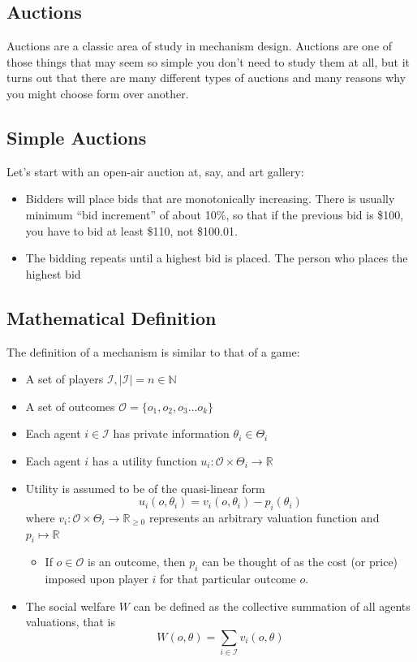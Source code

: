 \documentclass[11pt]{article}
\begin{document}
\subsection{Auctions}

Auctions are a classic area of study in mechanism design.
Auctions are one of those things that may seem so simple you don't need to study them at all, but it turns out that there are many different types of auctions and many reasons why you might choose form over another.

\subsection{Simple Auctions}

Let's start with an open-air auction at, say, and art gallery:
\begin{itemize}
    \item Bidders will place bids that are monotonically increasing. There is usually minimum ``bid increment'' of about 10\%, so that if the previous bid is \$100, you have to bid at least \$110, not \$100.01. 
    \item The bidding repeats until a highest bid is placed. The person who places the highest bid 
\end{itemize}

\subsection{Mathematical Definition}

The definition of a mechanism is similar to that of a game:

\begin{itemize}
    \item A set of players $\mathcal{I}, |\mathcal{I}| = n \in \mathbb{N}$
    \item A set of outcomes $\mathcal{O} = \{o_1, o_2, o_3...o_k\}$
    \item Each agent $i \in \mathcal{I}$ has private information $\theta_i \in \Theta_i$
    \item Each agent $i$ has a utility function $u_i : \mathcal{O} \times \Theta_i \rightarrow \mathbb{R}$
    \item Utility is assumed to be of the quasi-linear form $$u_i(o, \theta_i) = v_i(o, \theta_i) - p_i(\theta_i)$$ where $v_i : \mathcal{O} \times \Theta_i \rightarrow \mathbb{R}_{\geq 0}$ represents an arbitrary valuation function and $p_i \mapsto \mathbb{R}$ 
    \begin{itemize}
        \item If $o \in \mathcal{O}$ is an outcome, then $p_i$ can be thought of as the cost (or price) imposed upon player $i$ for that particular outcome $o$. 
    \end{itemize}
    \item The social welfare $W$ can be defined as the collective summation of all agents valuations, that is \begin{equation}W(o, \theta) = \sum_{i \in \mathcal{I}} v_i(o, \theta)\end{equation}
\end{itemize}
\end{document}

